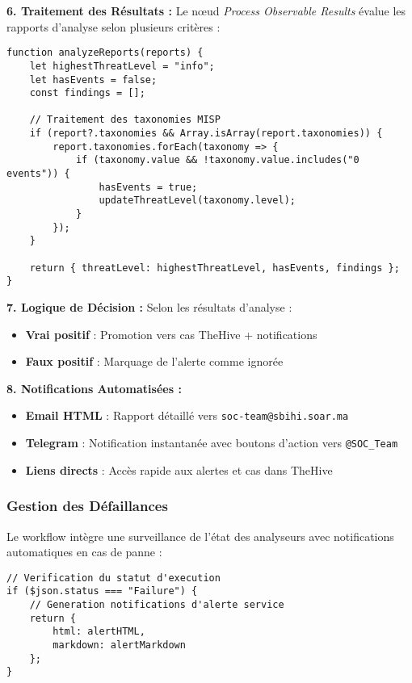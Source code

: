 \textbf{6. Traitement des Résultats :}
Le nœud \textit{Process Observable Results} évalue les rapports d'analyse selon plusieurs critères :

\begin{lstlisting}[style=JSStyle, caption=Évaluation des menaces, label=lst:threat-eval]
function analyzeReports(reports) {
    let highestThreatLevel = "info";
    let hasEvents = false;
    const findings = [];
    
    // Traitement des taxonomies MISP
    if (report?.taxonomies && Array.isArray(report.taxonomies)) {
        report.taxonomies.forEach(taxonomy => {
            if (taxonomy.value && !taxonomy.value.includes("0 events")) {
                hasEvents = true;
                updateThreatLevel(taxonomy.level);
            }
        });
    }
    
    return { threatLevel: highestThreatLevel, hasEvents, findings };
}
\end{lstlisting}

\textbf{7. Logique de Décision :}
Selon les résultats d'analyse :
\begin{itemize}
    \item \textbf{Vrai positif} : Promotion vers cas TheHive + notifications
    \item \textbf{Faux positif} : Marquage de l'alerte comme ignorée
\end{itemize}

\textbf{8. Notifications Automatisées :}
\begin{itemize}
    \item \textbf{Email HTML} : Rapport détaillé vers \texttt{soc-team@sbihi.soar.ma}
    \item \textbf{Telegram} : Notification instantanée avec boutons d'action vers \texttt{@SOC\_Team}
    \item \textbf{Liens directs} : Accès rapide aux alertes et cas dans TheHive
\end{itemize}

\subsubsection{Gestion des Défaillances}

Le workflow intègre une surveillance de l'état des analyseurs avec notifications automatiques en cas de panne :

\begin{lstlisting}[style=JSStyle, caption=Détection panne analyseur, label=lst:analyzer-fail]
// Verification du statut d'execution
if ($json.status === "Failure") {
    // Generation notifications d'alerte service
    return {
        html: alertHTML,
        markdown: alertMarkdown
    };
}
\end{lstlisting}

